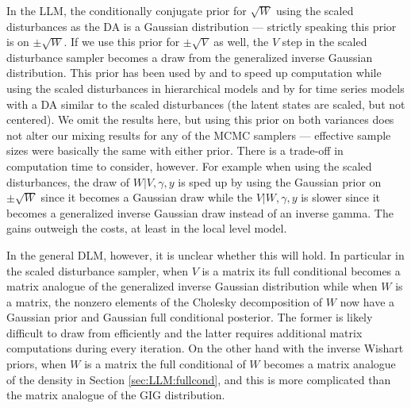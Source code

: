 \documentclass[12pt]{article}
\begin{document}
In the LLM, the conditionally conjugate prior for $\sqrt{W}$ using the scaled disturbances as the DA is a Gaussian distribution --- strictly speaking this prior is on $\pm \sqrt{W}$. If we use this prior for $\pm\sqrt{V}$ as well, the $V$ step in the scaled disturbance sampler becomes a draw from the generalized inverse Gaussian distribution. This prior has been used by \citet{fruhwirth2011bayesian} and \citet{fruhwirth2008bayesian} to speed up computation while using the scaled disturbances in hierarchical models and by \citet{fruhwirth2010stochastic} for time series models with a DA similar to the scaled disturbances (the latent states are scaled, but not centered). We omit the results here, but using this prior on both variances does not alter our mixing results for any of the MCMC samplers --- effective sample sizes were basically the same with either prior. There is a trade-off in computation time to consider, however. For example when using the scaled disturbances, the draw of $W|V,\gamma,y$ is sped up by using the Gaussian prior on $\pm\sqrt{W}$ since it becomes a Gaussian draw while the $V|W,\gamma,y$ is slower since it becomes a generalized inverse Gaussian draw instead of an inverse gamma. The gains outweigh the costs, at least in the local level model.

In the general DLM, however, it is unclear whether this will hold. In particular in the scaled disturbance sampler, when $V$ is a matrix its full conditional becomes a matrix analogue of the generalized inverse Gaussian distribution while when $W$ is a matrix, the nonzero elements of the Cholesky decomposition of $W$ now have a Gaussian prior and Gaussian full conditional posterior. The former is likely difficult to draw from efficiently and the latter requires additional matrix computations during every iteration. On the other hand with the inverse Wishart priors, when $W$ is a matrix the full conditional of $W$ becomes a matrix analogue of the density in Section \ref{sec:LLM:fullcond}, and this is more complicated than the matrix analogue of the GIG distribution.

\newpage
\end{document}
